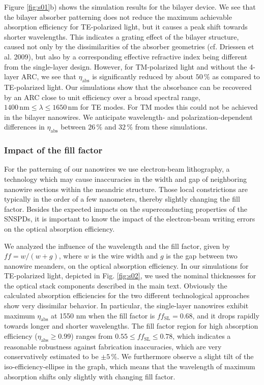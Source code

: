 \documentclass[aip,apl,showpacs,showkeys,preprint,superscriptaddress,preprintnumbers,amsmath,amssymb]{revtex4-1}
\begin{document}
\begin{bibunit}
Figure \ref{fig:s01}b) shows the simulation results for the bilayer device. We see that the bilayer absorber patterning does not reduce the maximum achievable absorption efficiency for TE-polarized light, but it causes a peak shift towards shorter wavelengths. This indicates a grating effect of the bilayer structure, caused not only by the dissimilarities of the absorber geometries (cf. Driessen et al. 2009\cite{Driessen2009}), but also by a corresponding effective refractive index being different from the single-layer design. However, for TM-polarized light and without the 4-layer ARC, we see that $\eta_\mathrm{abs}$ is significantly reduced by about $50\,\%$ as compared to TE-polarized light. Our simulations show that the absorbance can be recovered by an ARC close to unit efficiency over a broad spectral range, $1400\,\mathrm{nm}\le\lambda\le1650\,\mathrm{nm}$ for TE modes. For TM modes this could not be achieved in the bilayer nanowires. We anticipate wavelength- and polarization-dependent differences in $\eta_\mathrm{abs}$ between $26\,\%$ and $32\,\%$ from these simulations.




\subsubsection{Impact of the fill factor}

For the patterning of our nanowires we use electron-beam lithography, a technology which may cause inaccuracies in the width and gap of neighboring nanowire sections within the meandric structure. Those local constrictions are typically in the order of a few nanometers, thereby slightly changing the fill factor. Besides the expected impacts on the superconducting properties of the SNSPDs, it is important to know the impact of the electron-beam writing errors on the optical absorption efficiency.

We analyzed the influence of the wavelength and the fill factor, given by $ff=w/(w+g)$, where $w$ is the wire width and $g$ is the gap between two nanowire meanders, on the optical absorption efficiency. In our simulations for TE-polarized light, depicted in Fig. \ref{fig:s02}, we used the nominal thicknesses for the optical stack components described in the main text. Obviously the calculated absorption efficiencies for the two different technological approaches show very dissimilar behavior. In particular, the single-layer nanowires exhibit maximum $\eta_\mathrm{abs}$ at 1550 nm when the fill factor is $ff_\mathrm{SL}=0.68$, and it drops rapidly towards longer and shorter wavelengths. The fill factor region for high absorption efficiency ($\eta_\mathrm{abs}\ge0.99$) ranges from $0.55\le ff_\mathrm{SL}\le0.78$, which indicates a reasonable robustness against fabrication inaccuracies, which are very conservatively estimated to be $\pm5\,\%$. We furthermore observe a slight tilt of the iso-efficiency-ellipse in the graph, which means that the wavelength of maximum absorption shifts only slightly with changing fill factor.


\end{bibunit}
\end{document}
